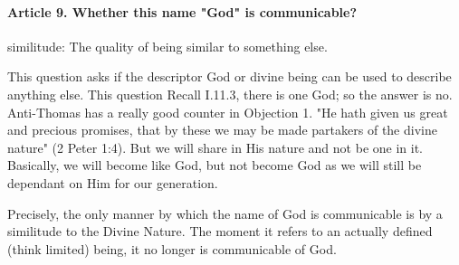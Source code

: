 \documentclass{ucetd}
\begin{document}
\paragraph{Article 9. Whether this name "God" is communicable?}
\gls{similitude}: The quality of being similar to something else.

This question asks if the descriptor God or divine being can be used to describe anything else. This question Recall I.11.3, there is one God; so the answer is no.
Anti-Thomas has a really good counter in Objection 1. 
"He hath given us great and precious promises, that by these we may be made partakers of the divine nature" (2 Peter 1:4).
But we will share in His nature and not be one in it. Basically, we will become like God, but not become God as we will still be dependant on Him for our generation.

Precisely, the only manner by which the name of God is communicable is by a similitude to the Divine Nature. The moment it refers to an actually defined (think limited) being, it no longer is communicable of God.

\end{document}
